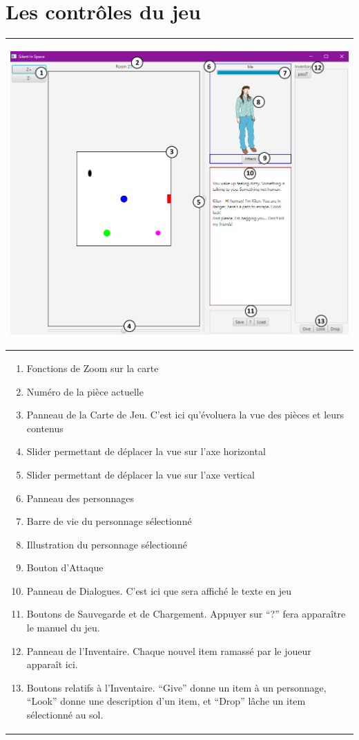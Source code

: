 \documentclass[./standalone.tex]{subfiles}
\begin{document}
\newpage

\section{Les contrôles du jeu}

\begin{tabular}{| m{40em} |}
\hline
	\begin{center}
	   \includegraphics[scale=0.4]{images/UI.png}
	\end{center}\\
\hline
	\begin{enumerate}
		\item Fonctions de Zoom sur la carte
		\item Numéro de la pièce actuelle
		\item Panneau de la Carte de Jeu. C’est ici qu’évoluera la vue des pièces et leurs contenus
		
		\item Slider permettant de déplacer la vue sur l'axe horizontal
		\item Slider permettant de déplacer la vue sur l'axe vertical
		\item Panneau des personnages
		
		\item Barre de vie du personnage sélectionné
		\item Illustration du personnage sélectionné
		\item Bouton d’Attaque
		
		\item Panneau de Dialogues. C’est ici que sera affiché le texte en jeu
		\item Boutons de Sauvegarde et de Chargement. Appuyer sur “?” fera apparaître le manuel du jeu.
		\item Panneau de l’Inventaire. Chaque nouvel item ramassé par le joueur apparaît ici.
		
		\item Boutons relatifs à l’Inventaire. “Give” donne un item à un personnage, “Look” donne une description d’un item, et “Drop” lâche un item sélectionné au sol.
	\end{enumerate}\\
\hline
\end{tabular}
\end{document}
